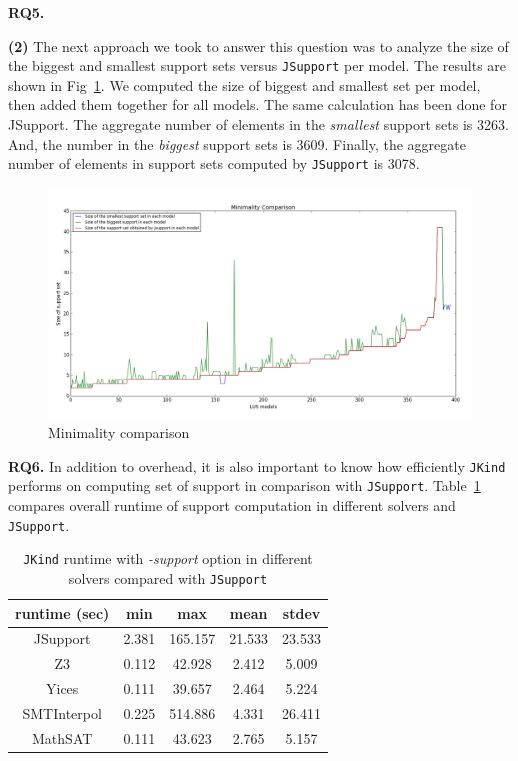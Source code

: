 \textbf{RQ5.} 

\textbf{(2)} The next approach we took to answer this question was to analyze the size of the biggest and smallest support sets versus \texttt{JSupport} per model. The results are shown in Fig~\ref{fig:minjsup}.
We computed the size of biggest and smallest set per model, then added them together for all models. The same calculation has been done for JSupport. The aggregate number of elements in the \emph{smallest} support sets is 3263. And, the number in the \emph{biggest} support sets is 3609. Finally, the aggregate number of elements in support sets computed by \texttt{JSupport} is 3078.

\begin{figure}
  \centering
  \includegraphics[width=\textwidth]{figs/minimality_analyses.png}
  \caption{Minimality comparison}\label{fig:minjsup}
\end{figure}


\noindent\fbox{%
    \parbox{\textwidth}{%

    }%
}
 \vspace{9pt}
  
 
\textbf{RQ6.} In addition to overhead, it is also important to know how efficiently \texttt{JKind} performs on computing set of support in comparison with \texttt{JSupport}. Table~\ref{tab:eff-comp-jsup} compares overall runtime of support computation in different solvers and \texttt{JSupport}.

\begin{table}
  \centering
  \begin{tabular}{ |c||c|c|c|c| }
    \hline
     runtime (sec) & min & max & mean & stdev \\[0.5ex]
    \hline\hline
    JSupport & 2.381 & 165.157 & 21.533 & 23.533 \\[0.5ex]
    Z3   & 0.112 & 42.928 & 2.412 & 5.009 \\[0.5ex]
    Yices &   0.111  & 39.657   & 2.464 & 5.224 \\[0.5ex]
    SMTInterpol& 0.225 & 514.886 &  4.331 & 26.411 \\[0.5ex]
    MathSAT & 0.111 & 43.623 &  2.765 & 5.157 \\[0.5ex]
    \hline
  \end{tabular}
  \caption{\small{\texttt{JKind} runtime with \emph{-support} option in different solvers compared with \texttt{JSupport}}}
  \label{tab:eff-comp-jsup}
\end{table}

